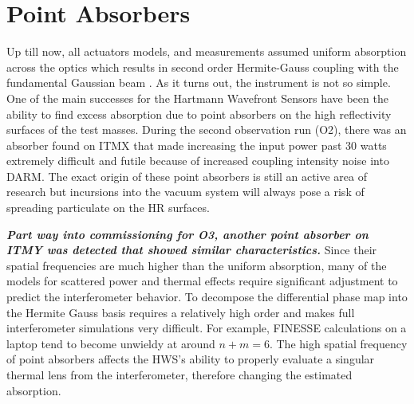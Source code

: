 \section{Point Absorbers}\label{sec:point_absorbers}
	Up till now, all actuators models, and measurements assumed uniform absorption across the optics which results in second order Hermite-Gauss coupling with the fundamental Gaussian beam .  As it turns out, the instrument is not so simple. One of the main successes for the Hartmann Wavefront Sensors have been the ability to find excess absorption due to point absorbers on the high reflectivity surfaces of the test masses.  During the second observation run (O2), there was an absorber found on ITMX that made increasing the input power past 30 watts extremely difficult and futile because of increased coupling intensity noise into DARM. The exact origin of these point absorbers is still an active area of research but incursions into the vacuum system will always pose a risk of spreading particulate on the HR surfaces.

	\textbf{\emph{Part way into commissioning for O3, another point absorber on ITMY was detected that showed similar characteristics.}}  Since their spatial frequencies are much higher than the uniform absorption, many of the models for scattered power and thermal effects require significant adjustment to predict the interferometer behavior.  To decompose the differential phase map into the Hermite Gauss basis requires a relatively high order and makes full interferometer simulations very difficult.  For example, FINESSE calculations on a laptop tend to become unwieldy at around $n+m = 6$.  The high spatial frequency of point absorbers affects the HWS's ability to properly evaluate a singular thermal lens from the interferometer, therefore changing the estimated absorption.  
	
